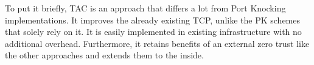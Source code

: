 To put it briefly, TAC is an approach that differs a lot from Port Knocking implementations. It improves the already existing TCP, unlike the PK schemes that solely rely on it. It is easily implemented in existing infrastructure with no additional overhead. Furthermore, it retains benefits of an external zero trust like the other approaches and extends them to the inside.\\\par
